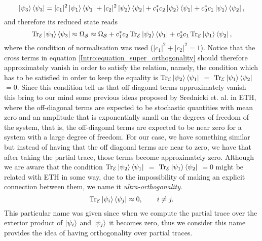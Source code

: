 \begin{equation}
\mathinner{|{\psi_3}\rangle}\mathinner{\langle{\psi_3}|} = |c_1|^2 \mathinner{|{\psi_1}\rangle}\mathinner{\langle{\psi_1}|} + |c_2|^2 \mathinner{|{\psi_2}\rangle}\mathinner{\langle{\psi_2}|}+c_1^*c_2\mathinner{|{\psi_2}\rangle}\mathinner{\langle{\psi_1}|} + c_2^*c_1\mathinner{|{\psi_1}\rangle}\mathinner{\langle{\psi_2}|},
\end{equation}
and therefore its reduced state reads
\begin{equation}
\operatorname{Tr}_{\mathcal{E}}\mathinner{|{\psi_3}\rangle}\mathinner{\langle{\psi_3}|} \approx \Omega_{\mathcal{S}}\approx \Omega_{\mathcal{S}}+c_1^*c_2\operatorname{Tr}_{\mathcal{E}}\mathinner{|{\psi_2}\rangle}\mathinner{\langle{\psi_1}|} + c_2^*c_1\operatorname{Tr}_{\mathcal{E}}\mathinner{|{\psi_1}\rangle}\mathinner{\langle{\psi_2}|},
\label{Intro:equation_super_orthogonality}
\end{equation}
where the condition of normalisation was used ($|c_1|^2 + |c_2|^2 =1$). Notice that the cross terms in equation \eqref{Intro:equation_super_orthogonality} should therefore approximately vanish in order to satisfy the relation, namely, the condition which has to be satisfied in order to keep the equality is $\operatorname{Tr}_{\mathcal{E}}\mathinner{|{\psi_2}\rangle}\mathinner{\langle{\psi_1}|}$ $=$ $\operatorname{Tr}_{\mathcal{E}}\mathinner{|{\psi_1}\rangle}\mathinner{\langle{\psi_2}|}$ $=0$. Since this condition tell us that off-diagonal terms approximately vanish this bring to our mind some previous ideas proposed by Srednicki et. al.\cite{srednicki_chaos_1994,deutsch_quantum_1991,rigol_alternatives_2012} in ETH, where the off-diagonal terms are expected to be stochastic quantities with mean zero and an amplitude that is exponentially small on the degrees of freedom of the system, that is, the off-diagonal terms are expected to be near zero for a system with a large degree of freedom. For our case, we have something similar but instead of having that the off diagonal terms are near to zero, we have that after taking the partial trace, those terms become approximately zero. Although we are aware that the condition $\operatorname{Tr}_{\mathcal{E}}\mathinner{|{\psi_2}\rangle}\mathinner{\langle{\psi_1}|}$ $=$ $\operatorname{Tr}_{\mathcal{E}}\mathinner{|{\psi_1}\rangle}\mathinner{\langle{\psi_2}|}$ $=0$ might be related with ETH in some way, due to the impossibility of making an explicit connection between them, we name it \textit{ultra-orthogonality}. 
\begin{equation}
\operatorname{Tr}_{\mathcal{E}}\mathinner{|{\psi_i}\rangle}\mathinner{\langle{\psi_j}|} \approx 0,\quad \quad i\neq j.
\label{Intro:Condition_ultraorthogonality}
\end{equation}
\indent This particular name was given since when we compute the partial trace over the exterior product of $\mathinner{|{\psi_i}\rangle}$ and $\mathinner{|{\psi_j}\rangle}$ it becomes zero, thus we consider this name provides the idea of having orthogonality over partial traces.\\

